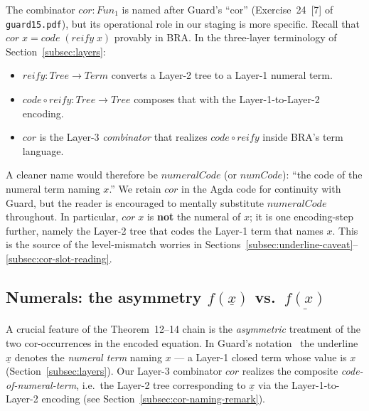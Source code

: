 \documentclass[11pt]{article}
\begin{document}
The combinator $\mathit{cor} : \mathit{Fun}_1$ is named after Guard's
``$\mathrm{cor}$'' (Exercise~24~[7] of \texttt{guard15.pdf}), but its
operational role in our staging is more specific.  Recall that
$\mathit{cor}\;x = \mathit{code}\;(\mathit{reify}\;x)$ provably in
BRA.  In the three-layer terminology of
Section~\ref{subsec:layers}:
\begin{itemize}
  \item $\mathit{reify} : \mathit{Tree} \to \mathit{Term}$ converts a
        Layer-2 tree to a Layer-1 numeral term.
  \item $\mathit{code} \circ \mathit{reify} : \mathit{Tree} \to \mathit{Tree}$
        composes that with the Layer-1-to-Layer-2 encoding.
  \item $\mathit{cor}$ is the Layer-3 \emph{combinator} that realizes
        $\mathit{code} \circ \mathit{reify}$ inside BRA's term language.
\end{itemize}
A cleaner name would therefore be $\mathit{numeralCode}$ (or
$\mathit{numCode}$): ``the code of the numeral term naming $x$.''  We
retain $\mathit{cor}$ in the Agda code for continuity with Guard, but
the reader is encouraged to mentally substitute
$\mathit{numeralCode}$ throughout.  In particular, $\mathit{cor}\;x$
is \textbf{not} the numeral of $x$; it is one encoding-step further,
namely the Layer-2 tree that codes the Layer-1 term that names $x$.
This is the source of the level-mismatch worries in
Sections~\ref{subsec:underline-caveat}--\ref{subsec:cor-slot-reading}.

\subsection{Numerals: the asymmetry $f(\underline{x})$ vs.\ $\underline{f(x)}$}
\label{subsec:num-cor}

A crucial feature of the Theorem~12--14 chain is the \emph{asymmetric}
treatment of the two cor-occurrences in the encoded equation.  In
Guard's notation~\cite{guard1963} the underline $\underline{x}$
denotes the \emph{numeral term} naming $x$ --- a Layer-1 closed term
whose value is $x$ (Section~\ref{subsec:layers}).  Our Layer-3
combinator $\mathit{cor}$ realizes the composite
\emph{code-of-numeral-term}, i.e.\ the Layer-2 tree corresponding to
$\underline{x}$ via the Layer-1-to-Layer-2 encoding (see
Section~\ref{subsec:cor-naming-remark}).
\end{document}
